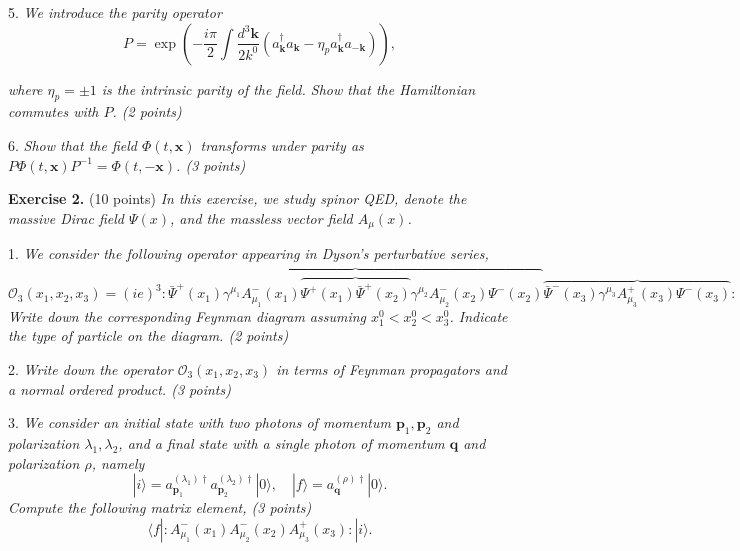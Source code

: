 5. \textit{We introduce the parity operator}
\begin{equation}
P = \exp \left( -\frac{i\pi}{2} \int \frac{d^3\mathbf{k}}{2k^0} (a^\dagger_{\mathbf{k}} a_{\mathbf{k}} - \eta_p a^\dagger_{\mathbf{k}} a_{-\mathbf{k}}) \right),
\end{equation}

\textit{where $\eta_p = \pm 1$ is the intrinsic parity of the field. Show that the Hamiltonian commutes with $P$. (2 points)}

6. \textit{Show that the field $\Phi(t, \mathbf{x})$ transforms under parity as $P \Phi(t, \mathbf{x}) P^{-1} = \Phi(t, -\mathbf{x})$. (3 points)}

\textbf{Exercise 2.} (10 points) \textit{In this exercise, we study spinor QED, denote the massive Dirac field $\Psi(x)$, and the massless vector field $A_\mu(x)$.}

1. \textit{We consider the following operator appearing in Dyson's perturbative series,}
\begin{equation}
\mathcal{O}_3(x_1, x_2, x_3) = (ie)^3 : 
\overbrace{\bar{\Psi}^+(x_1) \gamma^{\mu_1} A^-_{\mu_1}(x_1) \overbrace{\Psi^+(x_1) \bar{\Psi}^+(x_2)}^{\text{}} \gamma^{\mu_2} A^-_{\mu_2}(x_2) \Psi^-(x_2)}^{\text{}} \overbrace{\bar{\Psi}^-(x_3) \gamma^{\mu_3} A^+_{\mu_3}(x_3) \Psi^-(x_3)}^{\text{}} :
\end{equation}
\textit{Write down the corresponding Feynman diagram assuming $x^0_1 < x^0_2 < x^0_3$. Indicate the type of particle on the diagram. (2 points)}

2. \textit{Write down the operator $\mathcal{O}_3(x_1, x_2, x_3)$ in terms of Feynman propagators and a normal ordered product. (3 points)}

3. \textit{We consider an initial state with two photons of momentum $\mathbf{p}_1, \mathbf{p}_2$ and polarization $\lambda_1, \lambda_2$, and a final state with a single photon of momentum $\mathbf{q}$ and polarization $\rho$, namely}
\begin{equation}
|i\rangle = a^{(\lambda_1)\dagger}_{\mathbf{p}_1} a^{(\lambda_2)\dagger}_{\mathbf{p}_2} |0\rangle, \quad |f\rangle = a^{(\rho)\dagger}_{\mathbf{q}} |0\rangle.
\end{equation}
\textit{Compute the following matrix element, (3 points)}
\begin{equation}
\langle f | : A^-_{\mu_1}(x_1) A^-_{\mu_2}(x_2) A^+_{\mu_3}(x_3) : |i\rangle.
\end{equation}

